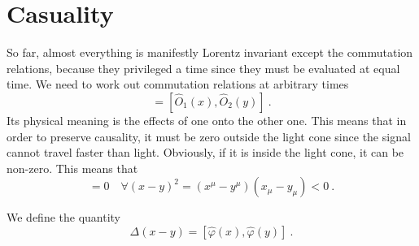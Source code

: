 \section{Casuality} 

    So far, almost everything is manifestly Lorentz invariant except the commutation relations, because they privileged a time since they must be evaluated at equal time. We need to work out commutation relations at arbitrary times 
    \begin{equation*}
        [\hat O_1 (t, \mathbf x), \hat O_2 (t', \mathbf y)] = [\hat O_1 (x), \hat O_2 (y)] ~.
    \end{equation*}
    Its physical meaning is the effects of one onto the other one. This means that in order to preserve causality, it must be zero outside the light cone since the signal cannot travel faster than light. Obviously, if it is inside the light cone, it can be non-zero. This means that
    \begin{equation*}
        [\hat O_1 (x), \hat O_2 (y)] = 0 \quad \forall (x - y)^2 = (x^\mu - y^\mu) (x_\mu - y_\mu) < 0 ~. 
    \end{equation*}

    We define the quantity 
    \begin{equation*}
        \Delta (x - y) = [\hat \varphi (x), \hat \varphi (y)] ~.
    \end{equation*}

